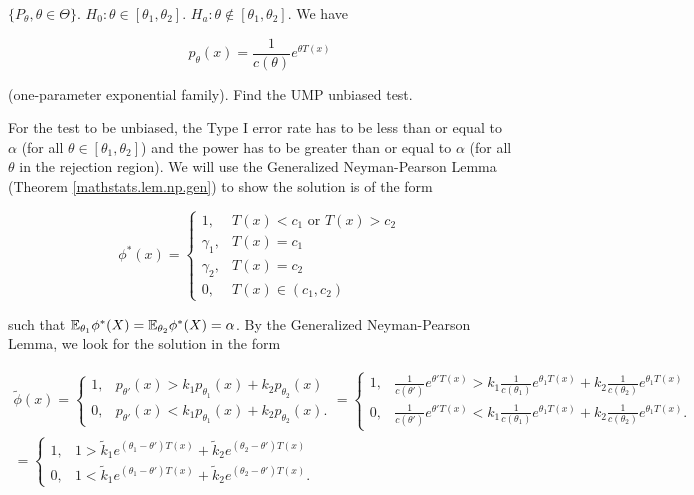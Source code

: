 \begin{example}\label{mathstats.gnp.ex.prob}

\(\{P_\theta, \theta \in \Theta\}\). \(H_0: \theta \in [\theta_1, \theta_2]\). \(H_a: \theta \notin [\theta_1, \theta_2]\). We have 

\[
p_\theta(x) =  \frac{1}{c(\theta)} e^{\theta T(x)}
\]

(one-parameter exponential family). Find the UMP unbiased test.

\end{example}

\begin{solution}

For the test to be unbiased, the Type I error rate has to be less than or equal to \(\alpha\) (for all \(\theta \in [\theta_1, \theta_2]\)) and the power has to be greater than or equal to \(\alpha\) (for all \(\theta\) in the rejection region). We will use the Generalized Neyman-Pearson Lemma (Theorem \ref{mathstats.lem.np.gen}) to show the solution is of the form

\[
\phi^*(x) = \begin{cases}
1, & T(x) < c_1 \text{ or } T(x) > c_2 \\
\gamma_1, & T(x) = c_1 \\
\gamma_2, & T(x) = c_2 \\
0, & T(x) \in (c_1, c_2)
\end{cases}
\]

such that \(\E_{\theta_1} \phi^*(X) = \E_{\theta_2} \phi^*(X) = \alpha\). By the Generalized Neyman-Pearson Lemma, we look for the solution in the form

\begin{multline}\label{mathstats.np.gen.ex.a}
\tilde{\phi}(x) = \begin{cases}
1, & p_{\theta'}(x) > k_1  p_{\theta_1}(x) + k_2 p_{\theta_2}(x) \\
0, & p_{\theta'}(x) < k_1  p_{\theta_1}(x) + k_2 p_{\theta_2}(x).
\end{cases}
= \begin{cases}
1, & \frac{1}{c(\theta')} e^{\theta' T(x)}> k_1  \frac{1}{c(\theta_1)} e^{\theta_1 T(x)}+ k_2  \frac{1}{c(\theta_2)} e^{\theta_1 T(x)}\\
0, & \frac{1}{c(\theta')} e^{\theta' T(x)}< k_1  \frac{1}{c(\theta_1)} e^{\theta_1 T(x)} + k_2 \frac{1}{c(\theta_2)} e^{\theta_1 T(x)}.
\end{cases}
\\ = \begin{cases}
1, & 1 > \tilde{k}_1e^{(\theta_1 - \theta') T(x)} + \tilde{k}_2e^{(\theta_2  - \theta') T(x)} \\
0, & 1 < \tilde{k}_1e^{(\theta_1 - \theta') T(x)} + \tilde{k}_2e^{(\theta_2  - \theta') T(x)}.
\end{cases}
\end{multline}


\end{solution}
